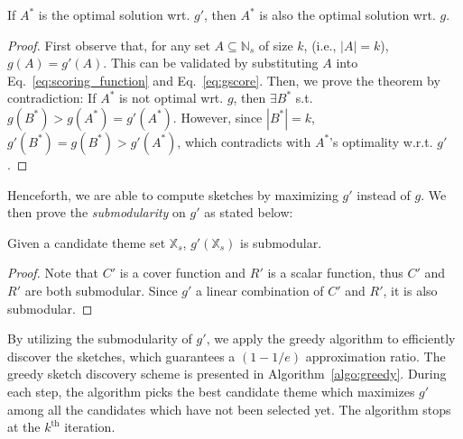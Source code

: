 \begin{theorem}
If $A^*$ is the optimal solution wrt. $g'$, then $A^*$ is
also the optimal solution wrt. $g$.
\end{theorem}
\begin{proof}
First observe that, for any set $A \subseteq \mathbb{N}_s$ of size $k$, (i.e., $|A|=k$),
$g(A) = g'(A)$. This can be validated by substituting $A$ into Eq.~\ref{eq:scoring_function} and Eq.~\ref{eq:gscore}. Then,
we prove the theorem by contradiction: 
If $A^*$ is not optimal wrt. $g$, then $\exists B^*$ s.t. $g(B^*) > g(A^*)=g'(A^*)$. However,
since $|B^*|=k$, $g'(B^*)=g(B^*) > g'(A^*)$, which contradicts with $A^*$'s optimality w.r.t. $g'$.
\end{proof}

Henceforth, we are able to compute sketches by maximizing $g'$ instead of $g$. 
We then prove the \emph{submodularity} on $g'$ as stated below:
\begin{theorem}
\label{thm:submodular}
Given a candidate theme set $\mathbb{X}_s$,
$g'(\mathbb{X}_s)$ is submodular.
\end{theorem}
\begin{proof}
Note that $C'$ is a cover function and $R'$ 
is a scalar function, thus $C'$ and $R'$ are both submodular.
Since $g'$ a linear combination of $C'$ and $R'$,
it is also submodular.
\end{proof}

By utilizing the submodularity of $g'$, we apply the greedy algorithm \cite{Fisher1978An} 
to efficiently discover the sketches,
which guarantees a $(1-1/e)$ approximation ratio. 
The greedy sketch discovery scheme is presented in Algorithm~\ref{algo:greedy}. During each step, 
the algorithm picks the best candidate theme which maximizes $g'$ 
among all the candidates which have not been selected yet. The algorithm stops at the $k^{\text{th}}$ iteration.

